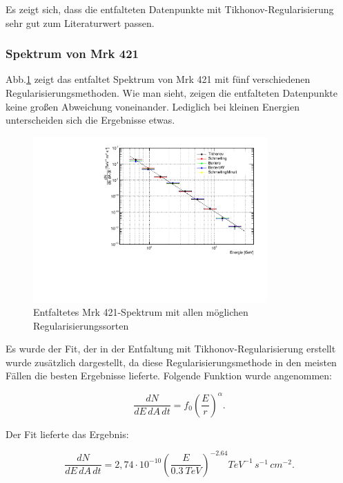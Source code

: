 Es zeigt sich, dass die entfalteten Datenpunkte mit Tikhonov-Regularisierung sehr gut zum Literaturwert passen.

\subsubsection{Spektrum von Mrk 421}
Abb.\ref{Datenset2_CombunFold_Mrk421} zeigt das entfaltet Spektrum von Mrk 421 mit fünf verschiedenen Regularisierungsmethoden.
Wie man sieht, zeigen die entfalteten Datenpunkte keine großen Abweichung voneinander. 
Lediglich bei kleinen Energien unterscheiden sich die Ergebnisse etwas.

\begin{figure}
    \centering
    \includegraphics[width=0.8\textwidth]{./Plots/04_MrkAnalyse/Datenset2/Spektrum_Mrk421.pdf}
    \caption{Entfaltetes Mrk 421-Spektrum mit allen möglichen Regularisierungssorten}
    \label{Datenset2_CombunFold_Mrk421}
\end{figure}

Es wurde der Fit, der in der Entfaltung mit Tikhonov-Regularisierung erstellt wurde zusätzlich dargestellt, da diese Regularisierungsmethode in den meisten Fällen die besten Ergebnisse lieferte.
Folgende Funktion wurde angenommen:

\begin{equation}
 \frac{dN}{dE\,dA\,dt}=f_0\left( \frac{E}{r} \right)^\alpha.
\end{equation}

Der Fit lieferte das Ergebnis:

\begin{equation}
 \frac{dN}{dE\,dA\,dt}=2,74 \cdot 10^{-10}\left( \frac{E}{\SI{0,3}{TeV}} \right)^{-2.64} \si{TeV^{-1}\,s^{-1}\,cm^{-2}}.
\end{equation}


